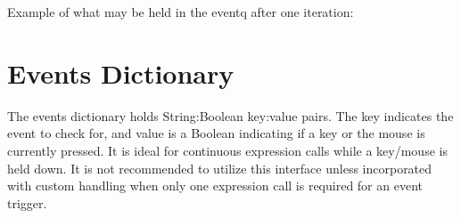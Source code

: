 \documentclass[letterpaper,10pt,english]{sphinxmanual}
\begin{document}
\sphinxAtStartPar
Example of what may be held in the eventq after one iteration:
\def\sphinxLiteralBlockLabel{\label{\detokenize{fundamentals:id15}}}
\begin{sphinxVerbatim}[commandchars=\\\{\}]
 \PYG{p}{[} \PYG{p}{]}
\end{sphinxVerbatim}


\section{Events Dictionary}
\label{\detokenize{fundamentals:events-dictionary}}
\sphinxAtStartPar
The events dictionary holds String:Boolean key:value pairs. The key indicates the event to check for, and value is a Boolean indicating if a key or the mouse is currently pressed. It is ideal for continuous expression calls while a key/mouse is held down. It is not recommended to utilize this interface unless incorporated with custom handling when only one expression call is required for an event trigger.
\def\sphinxLiteralBlockLabel{\label{\detokenize{fundamentals:id16}}}
\begin{sphinxVerbatim}[commandchars=\\\{\}]
  
      \PYG{p}{[}\PYG{p}{]}
\end{sphinxVerbatim}
\end{document}

